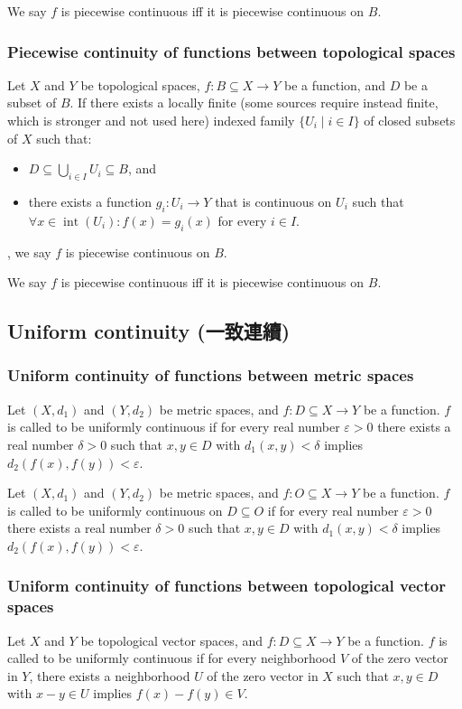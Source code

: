 \documentclass[a4paper,12pt]{report}
\begin{document}
\begin{itemize}
\begin{itemize}
We say $f$ is piecewise continuous iff it is piecewise continuous on $B$.
\subsubsection{Piecewise continuity of functions between topological spaces}
Let $X$ and $Y$ be topological spaces, $f\colon B\subseteq X\to Y$ be a function, and $D$ be a subset of $B$. If there exists a locally finite (some sources require instead finite, which is stronger and not used here) indexed family $\{U_i\mid i\in I\}$ of closed subsets of $X$ such that:
\begin{itemize}
\item $D\subseteq\bigcup_{i\in I}U_i\subseteq B$, and
\item there exists a function $g_i\colon U_i\to Y$ that is continuous on $U_i$ such that $\forall x\in\operatorname{int}\left(U_i\right)\colon f(x)=g_i(x)$ for every $i\in I$.
\end{itemize},
we say $f$ is piecewise continuous on $B$.

We say $f$ is piecewise continuous iff it is piecewise continuous on $B$.
\subsection{Uniform continuity (一致連續)}
\subsubsection{Uniform continuity of functions between metric spaces}
Let $(X,d_1)$ and $(Y,d_2)$ be metric spaces, and $f\colon D\subseteq X\to Y$ be a function. $f$ is called to be uniformly continuous if for every real number $\varepsilon >0$ there exists a real number $\delta >0$ such that $x,y\in D$ with $d_{1}(x,y)<\delta$ implies $d_{2}(f(x),f(y))<\varepsilon$.

Let $(X,d_1)$ and $(Y,d_2)$ be metric spaces, and $f\colon O\subseteq X\to Y$ be a function. $f$ is called to be uniformly continuous on $D\subseteq O$ if for every real number $\varepsilon >0$ there exists a real number $\delta >0$ such that $x,y\in D$ with $d_{1}(x,y)<\delta$ implies $d_{2}(f(x),f(y))<\varepsilon$.
\subsubsection{Uniform continuity of functions between topological vector spaces}
Let $X$ and $Y$ be topological vector spaces, and $f\colon D\subseteq X\to Y$ be a function. $f$ is called to be uniformly continuous if for every neighborhood $V$ of the zero vector in $Y$, there exists a neighborhood $U$ of the zero vector in $X$ such that $x,y\in D$ with $x-y\in U$ implies $f(x)-f(y)\in V$.


\end{itemize}
\end{itemize}
\end{document}
